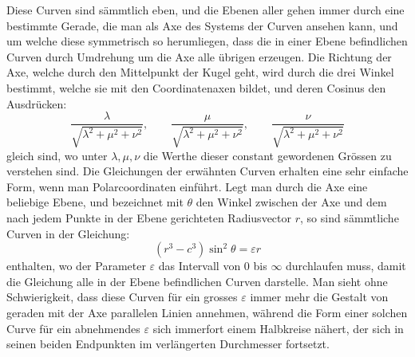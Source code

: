 \documentclass[11pt]{article}
\begin{document}
Diese Curven sind sämmtlich eben, und die Ebenen aller gehen immer durch eine bestimmte Gerade, die man als Axe des Systems der Curven ansehen kann, und um welche diese symmetrisch so herumliegen, dass die in einer Ebene befindlichen Curven durch Umdrehung um die Axe alle übrigen erzeugen. Die Richtung der Axe, welche durch den Mittelpunkt der Kugel geht, wird durch die drei Winkel bestimmt, welche sie mit den Coordinatenaxen bildet, und deren Cosinus den Ausdrücken:
\[
 \frac{\lambda}{\sqrt{\lambda^2+\mu^2+\nu^2}},\qquad
 \frac{\mu}{\sqrt{\lambda^2+\mu^2+\nu^2}},\qquad
 \frac{\nu}{\sqrt{\lambda^2+\mu^2+\nu^2}}
\]
gleich sind, wo unter $\lambda,\mu,\nu$ die Werthe dieser constant gewordenen Grössen zu verstehen sind. Die Gleichungen der erwähnten Curven erhalten eine sehr einfache Form, wenn man Polarcoordinaten einführt. Legt man durch die Axe eine beliebige Ebene, und bezeichnet mit $\theta$ den Winkel zwischen der Axe und dem nach jedem Punkte in der Ebene gerichteten Radiusvector $r$, so sind sämmtliche Curven in der Gleichung:
\[
 (r^3-c^3)\sin^2\theta=\varepsilon r
\]
enthalten, wo der Parameter $\varepsilon$ das Intervall von $0$ bis $\infty$ durchlaufen muss, damit die Gleichung alle in der Ebene befindlichen Curven darstelle. Man sieht ohne Schwierigkeit, dass diese Curven für ein grosses $\varepsilon$ immer mehr die Gestalt von geraden mit der Axe parallelen Linien annehmen, während die Form einer solchen Curve für ein abnehmendes $\varepsilon$ sich immerfort einem Halbkreise nähert, der sich in seinen beiden Endpunkten im verlängerten Durchmesser fortsetzt.
\end{document}

